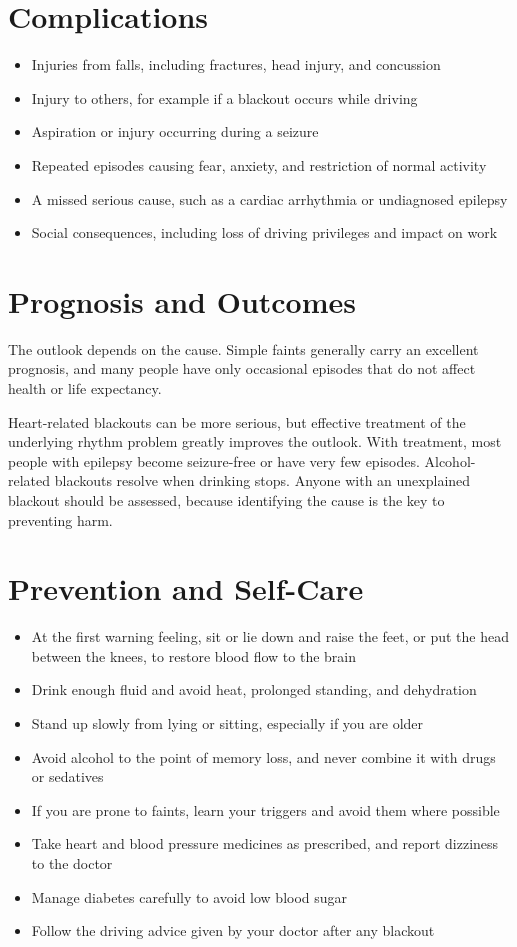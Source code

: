 \section*{Complications}
\begin{itemize}
    \item Injuries from falls, including fractures, head injury, and concussion
    \item Injury to others, for example if a blackout occurs while driving
    \item Aspiration or injury occurring during a seizure
    \item Repeated episodes causing fear, anxiety, and restriction of normal activity
    \item A missed serious cause, such as a cardiac arrhythmia or undiagnosed epilepsy
    \item Social consequences, including loss of driving privileges and impact on work
\end{itemize}

\section*{Prognosis and Outcomes}
The outlook depends on the cause. Simple faints generally carry an excellent prognosis, and many people have only occasional episodes that do not affect health or life expectancy.

Heart-related blackouts can be more serious, but effective treatment of the underlying rhythm problem greatly improves the outlook. With treatment, most people with epilepsy become seizure-free or have very few episodes. Alcohol-related blackouts resolve when drinking stops. Anyone with an unexplained blackout should be assessed, because identifying the cause is the key to preventing harm.

\section*{Prevention and Self-Care}
\begin{itemize}
    \item At the first warning feeling, sit or lie down and raise the feet, or put the head between the knees, to restore blood flow to the brain
    \item Drink enough fluid and avoid heat, prolonged standing, and dehydration
    \item Stand up slowly from lying or sitting, especially if you are older
    \item Avoid alcohol to the point of memory loss, and never combine it with drugs or sedatives
    \item If you are prone to faints, learn your triggers and avoid them where possible
    \item Take heart and blood pressure medicines as prescribed, and report dizziness to the doctor
    \item Manage diabetes carefully to avoid low blood sugar
    \item Follow the driving advice given by your doctor after any blackout
\end{itemize}

